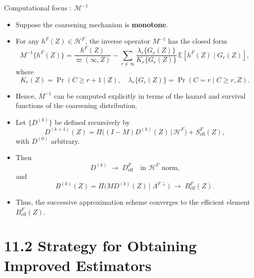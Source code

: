 \documentclass[xcolor=dvipsnames,aspectratio=169]{beamer}
\newcommand{\1}{\mathbbm{1}}
\begin{document}
\begin{frame}{Computational focus : $\mathcal{M}^{-1}$}
  \begin{tcolorbox}[colframe=Cyan,title=Theorem 11.2]
    \begin{itemize}
      \item Suppose the coarsening mechanism is \textbf{monotone}.
      \item For any $h^{F}(Z)\in\mathcal{H}^{F}$, the inverse operator $M^{-1}$ has the closed form
      \[
        M^{-1}\{h^{F}(Z)\}
        = \frac{h^{F}(Z)}{\varpi(\infty,Z)}
        - \sum_{r\neq\infty}
          \frac{\lambda_{r}\{G_{r}(Z)\}}{K_{r}\{G_{r}(Z)\}}
          \,\mathbb{E}\!\left[ h^{F}(Z)\mid G_{r}(Z)\right],
      \]
      where
      \[
        K_{r}(Z) = \Pr(C\ge r+1\mid Z), 
        \quad
        \lambda_{r}\{G_{r}(Z)\} = \Pr(C=r\mid C\ge r, Z).
      \]
      \item Hence, $M^{-1}$ can be computed explicitly in terms of the hazard and survival functions of the coarsening distribution.
    \end{itemize}
  \end{tcolorbox}
  \begin{tcolorbox}[colframe=lightgray,title=Lemma 11.2]
    \begin{itemize}
      \item Let $\{D^{(k)}\}$ be defined recursively by
      \[
        D^{(k+1)}(Z)
        =
        \Pi\!\Big((I-M)D^{(k)}(Z)\,\Big|\,\mathcal{H}^{F}\Big)
        + S^{F}_{\mathrm{eff}}(Z),
      \]
      with $D^{(0)}$ arbitrary.
      \item Then
      \[
        D^{(k)} \;\longrightarrow\; D^{F}_{\mathrm{eff}}
        \quad\text{in $\mathcal{H}^{F}$ norm,}
      \]
      and
      \[
        B^{(k)}(Z)
        = \Pi\!\big(MD^{(k)}(Z)\,\big|\;\Lambda^{F\perp}\big)
        \;\longrightarrow\; B^{F}_{\mathrm{eff}}(Z).
      \]
      \item Thus, the successive approximation scheme converges to the efficient element $B^{F}_{\mathrm{eff}}(Z)$.
    \end{itemize}
  \end{tcolorbox}
\end{frame}

\section{11.2 Strategy for Obtaining Improved Estimators}

\begin{frame}
  
\end{frame}
\end{document}
